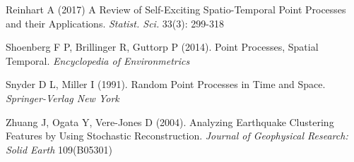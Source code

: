 \documentclass[11pt,a4paper]{article}
\begin{document}
\begin{thebibliography}{99}
 Reinhart A (2017) A Review of Self-Exciting Spatio-Temporal Point Processes and their Applications. \textit{Statist. Sci.} 33(3): 299-318

 Shoenberg F P, Brillinger R, Guttorp P (2014). Point Processes, Spatial Temporal. \textit{Encyclopedia of Environmetrics}

 Snyder D L, Miller I (1991). Random Point Processes in Time and Space. \textit{Springer-Verlag New York}

 Zhuang J, Ogata Y, Vere-Jones D (2004). Analyzing Earthquake Clustering Features by Using Stochastic Reconstruction. \textit{Journal of Geophysical Research: Solid Earth} 109(B05301)

\end{thebibliography}
\end{document}
